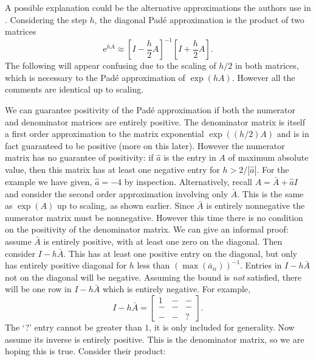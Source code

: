 A possible explanation could be the alternative approximations the authors use in \cite{blanes_pos_2022}.
Considering the step $h$, the diagonal Pad\'e approximation is the product of two matrices
\begin{equation*}
    \mathrm{e}^{hA} \approx \left[ I - \frac{h}{2} A \right]^{-1} \left[ I + \frac{h}{2}A \right].
\end{equation*}
The following will appear confusing due to the scaling of $h/2$ in both matrices, which is necessary to the Pad\'e approximation of $\exp(hA)$.
However all the comments are identical up to scaling.

We can guarantee positivity of the Pad\'e approximation if both the numerator and denominator matrices are entirely positive.
The denominator matrix is itself a first order approximation to the matrix exponential $\exp((h/2)A)$ and is in fact guaranteed to be positive (more on this later).
However the numerator matrix has no guarantee of positivity: if $\hat{a}$ is the entry in $A$ of maximum absolute value,
then this matrix has at least one negative entry for $h > 2/|\hat{a}|$.
For the example we have given, $\hat{a} = -4$ by inspection.
Alternatively, recall $A = \bar{A} + \hat{a}I$ and consider the second order approximation involving only $\bar{A}$.
This is the same as $\exp(A)$ up to scaling, as shown earlier.
Since $\bar{A}$ is entirely nonnegative the numerator matrix must be nonnegative.
However this time there is no condition on the positivity of the denominator matrix.
We can give an informal proof:
assume $\bar{A}$ is entirely positive, with at least one zero on the diagonal.
Then consider $I - h\bar{A}$. This has at least one positive entry on the diagonal, but only has entirely positive diagonal for $h$ less than $(\max(\bar{a}_{ii}))^{-1}$.
Entries in $I - h\bar{A}$ not on the diagonal will be negative. Assuming the bound is \textit{not} satisfied, there will be one row in $I - h\bar{A}$ which is entirely negative.
For example,
\begin{equation*}
    I - h\bar{A} = \begin{bmatrix}
        1 & - & - \\
        - & - & - \\
        - & - & ?
    \end{bmatrix}.
\end{equation*}
The `?' entry cannot be greater than $1$, it is only included for generality.
Now assume its inverse is entirely positive. This is the denominator matrix, so we are hoping this is true.
Consider their product:
